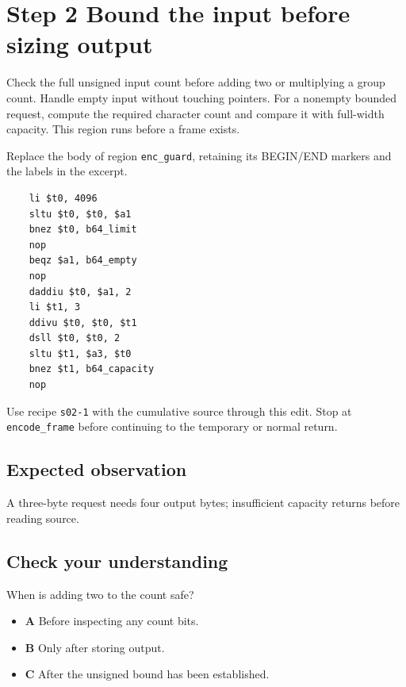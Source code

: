\section{Step 2 Bound the input before sizing output}\label{base64-s02}

Check the full unsigned input count before adding two or multiplying a group count. Handle empty input without touching pointers. For a nonempty bounded request, compute the required character count and compare it with full-width capacity. This region runs before a frame exists.

Replace the body of region \texttt{enc\_guard}, retaining its BEGIN/END markers and the labels in the excerpt.

\begin{verbatim}
    li $t0, 4096
    sltu $t0, $t0, $a1
    bnez $t0, b64_limit
    nop
    beqz $a1, b64_empty
    nop
    daddiu $t0, $a1, 2
    li $t1, 3
    ddivu $t0, $t0, $t1
    dsll $t0, $t0, 2
    sltu $t1, $a3, $t0
    bnez $t1, b64_capacity
    nop
\end{verbatim}

Use recipe \texttt{s02-1} with the cumulative source through this edit. Stop at \texttt{encode\_frame} before continuing to the temporary or normal return.

\subsection{Expected observation}
A three-byte request needs four output bytes; insufficient capacity returns before reading source.

\subsection{Check your understanding}
When is adding two to the count safe?

\begin{itemize}
  \item \textbf{A} Before inspecting any count bits.
  \item \textbf{B} Only after storing output.
  \item \textbf{C} After the unsigned bound has been established.
\end{itemize}
